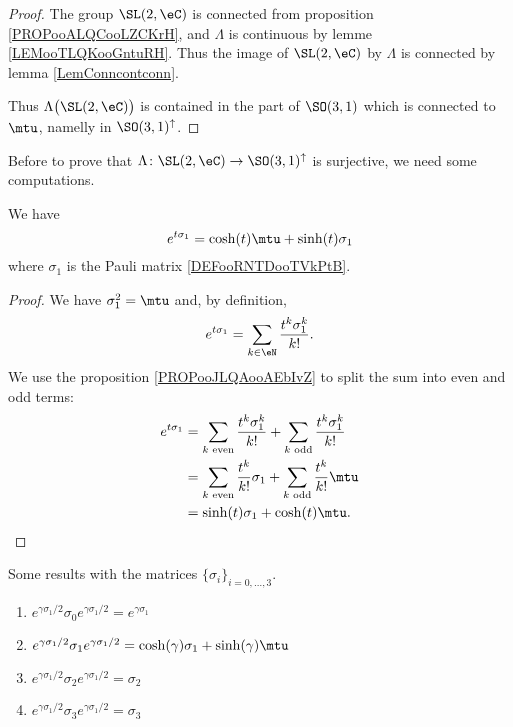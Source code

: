 \begin{proof}
	The group \( \SL(2,\eC)\) is connected from proposition \ref{PROPooALQCooLZCKrH}, and \( \Lambda\) is continuous by lemme \ref{LEMooTLQKooGntuRH}. Thus the image of \( \SL(2,\eC)\) by \( \Lambda\) is connected by lemma \ref{LemConncontconn}.

	Thus \( \Lambda\big( \SL(2,\eC) \big)\) is contained in the part of \( \SO(3,1)\) which is connected to \( \mtu\), namelly in \( \SO(3,1)^{\uparrow}\).
\end{proof}

Before to prove that \( \Lambda\colon \SL(2,\eC)\to \SO(3,1)^{\uparrow}\) is surjective, we need some computations.

\begin{lemma}
	We have
	\begin{equation}
		e^{t\sigma_1}=\cosh(t )\mtu+\sinh( t )\sigma_1
	\end{equation}
	where \( \sigma_1\) is the Pauli matrix \eqref{DEFooRNTDooTVkPtB}.
\end{lemma}

\begin{proof}
	We have \( \sigma_1^2=\mtu\) and, by definition,
	\begin{equation}
		e^{t\sigma_1}=\sum_{k\in \eN}\frac{ t^k\sigma_1^k }{ k! }.
	\end{equation}
	We use the proposition \ref{PROPooJLQAooAEbIvZ} to split the sum into even and odd terms:
	\begin{subequations}
		\begin{align}
			e^{t\sigma_1} & =\sum_{k\text{ even}}\frac{ t^k\sigma_1^k }{ k! }+  \sum_{k\text{ odd}}\frac{ t^k\sigma_1^k }{ k! } \\
			              & =\sum_{k\text{ even}}\frac{ t^k }{ k! }\sigma_1+  \sum_{k\text{ odd}}\frac{ t^k }{ k! }\mtu         \\
			              & =\sinh(t)\sigma_1+\cosh(t)\mtu.
		\end{align}
	\end{subequations}
\end{proof}

\begin{lemma}       \label{LEMooPKYXooWGZkkG}
	Some results with the matrices \( \{ \sigma_i \}_{i=0,\ldots, 3}\).
	\begin{enumerate}
		\item
		      \(  e^{\gamma \sigma_1/2}\sigma_0 e^{\gamma\sigma_1/2}= e^{\gamma\sigma_1}\)
		\item
		      \(  e^{\gamma \sigma_1/2}\sigma_1 e^{\gamma\sigma_1/2}= \cosh(\gamma)\sigma_1+\sinh(\gamma)\mtu\)
		\item
		      \(  e^{\gamma \sigma_1/2}\sigma_2 e^{\gamma\sigma_1/2}= \sigma_2\)
		\item
		      \(  e^{\gamma \sigma_1/2}\sigma_3 e^{\gamma\sigma_1/2}= \sigma_3\)
	\end{enumerate}
\end{lemma}


